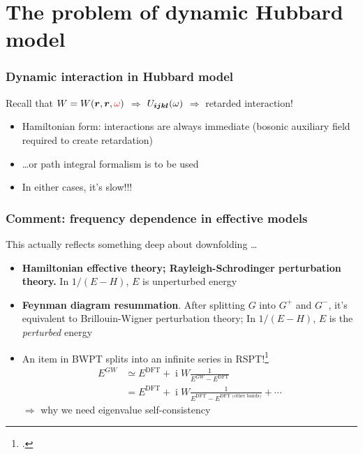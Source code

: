 \documentclass{beamer}
\DeclareMathOperator{\ii}{i}
\newcommand{\concept}[1]{\textbf{#1}}
\begin{document}
\section{The problem of dynamic Hubbard model}

\begin{frame}
\frametitle{Dynamic interaction in Hubbard model}

Recall that $W = W(\vb*{r}, \vb*{r}, \textcolor{red}{\omega} )$
$\Rightarrow$ 
$U_{\vb*{i} \vb*{j} \vb*{k} \vb*{l}}(\omega)$
$\Rightarrow$
retarded interaction! 

\begin{itemize}
    \item Hamiltonian form: interactions are always immediate 
    (bosonic auxiliary field required to create retardation)
    \item \dots or path integral formalism is to be used 
    \item In either cases, it's slow!!! 
\end{itemize}

\end{frame}

\begin{frame}
\frametitle{Comment: frequency dependence in effective models}

This actually reflects something deep about downfolding \dots 

\begin{itemize}
    \item \concept{Hamiltonian effective theory; Rayleigh-Schrodinger perturbation theory.}
        In $1 / (E - H)$, 
        $E$ is unperturbed energy 
    \item \concept{Feynman diagram resummation}.  
        After splitting $G$ into $G^+$ and $G^-$,
        it's equivalent to Brillouin-Wigner perturbation theory;
        In $1 / (E - H)$, 
        $E$ is the \emph{perturbed} energy
    \item An item in BWPT splits into an infinite series in RSPT!\footcite{brueckner1955many}
        \begin{equation}
            \begin{aligned}
                E^{GW} &\simeq E^{\text{DFT}} + \ii W \frac{1}{E^{GW} - E^{\text{DFT}}} \\
                &= E^{\text{DFT}} + \ii W \frac{1}{E^{\text{DFT}} - E^{\text{DFT (other bands)}}}
                + \cdots
            \end{aligned}
        \end{equation}
        $\Rightarrow$ why we need eigenvalue self-consistency
\end{itemize}

\end{frame}
\end{document}

